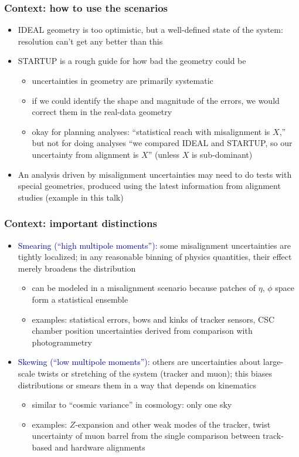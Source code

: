 \documentclass[compress]{beamer}
\begin{document}
\begin{frame}
\frametitle{Context: how to use the scenarios}
\begin{itemize}
\item IDEAL geometry is too optimistic, but a well-defined state of
  the system: resolution can't get any better than this
\item STARTUP is a rough guide for how bad the geometry could be
\begin{itemize}
\item uncertainties in geometry are primarily systematic
\item if we could identify the shape and magnitude of the errors, we
  would correct them in the real-data geometry
\item okay for planning analyses: ``statistical reach with
  misalignment is $X$,'' but not for doing analyses ``we compared
  IDEAL and STARTUP, so our uncertainty from alignment is $X$''
  (unless $X$ is sub-dominant)
\end{itemize}
\item An analysis driven by misalignment uncertainties may need to do
  tests with special geometries, produced using the latest information
  from alignment studies (example in this talk)
\end{itemize}
\end{frame}

\begin{frame}
\frametitle{Context: important distinctions}
\begin{itemize}
\item \textcolor{darkblue}{Smearing (``high multipole moments''):} some
  misalignment uncertainties are tightly localized; in any reasonable
  binning of physics quantities, their effect merely broadens the
  distribution
\begin{itemize}
\item can be modeled in a misalignment scenario because patches of
  $\eta$, $\phi$ space form a statistical ensemble
\item examples: statistical errors, bows and kinks of tracker sensors,
  CSC chamber position uncertainties derived from comparison with
  photogrammetry
\end{itemize}

\item \textcolor{darkblue}{Skewing (``low multipole moments''):} others are
  uncertainties about large-scale twists or stretching of the system
  (tracker and muon); this biases distributions or smears them in a way
  that depends on kinematics
\begin{itemize}
\item similar to ``cosmic variance'' in cosmology: only one sky
\item examples: $Z$-expansion and other weak modes of the tracker,
  twist uncertainty of muon barrel from the single comparison between
  track-based and hardware alignments
\end{itemize}
\end{itemize}
\end{frame}
\end{document}
